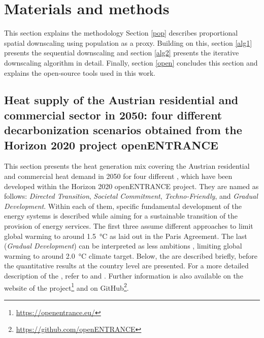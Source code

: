 \section{Materials and methods}\label{methodology}
This section explains the methodology   Section \ref{pop} describes proportional spatial downscaling using population as a proxy. Building on this, section \ref{alg1} presents the sequential downscaling and section \ref{alg2} presents the iterative downscaling algorithm in detail.  Finally, section \ref{open} concludes this section and explains the open-source tools used in this work.

\subsection{Heat supply of the Austrian residential and commercial sector in 2050: four different decarbonization scenarios obtained from the Horizon 2020 project openENTRANCE}\label{res:1}
This section presents the heat generation mix covering the Austrian residential and commercial heat demand in 2050 for four different , which have been developed within the Horizon 2020 openENTRANCE project. They are named as follows: \textit{Directed Transition}, \textit{Societal Commitment}, \textit{Techno-Friendly}, and \textit{Gradual Development}. Within each of them, specific fundamental development of the energy systems is described while aiming for a sustainable transition of the provision of energy services. The first three  assume different approaches to limit global warming to around \SI{1.5}{\degreeCelsius} as laid out in the Paris Agreement. The last  (\textit{Gradual Development}) can be interpreted as less ambitions , limiting global warming to around \SI{2.0}{\degreeCelsius} climate target. Below, the  are described briefly, before the quantitative results at the country level are presented. For a more detailed description of the , refer to \cite{auer2020quantitative} and \cite{auer2020development}. Further information is also available on the website of the project\footnote{\url{https://openentrance.eu/}} and on GitHub\footnote{\url{https://github.com/openENTRANCE}}.\vspace{0.3cm}

